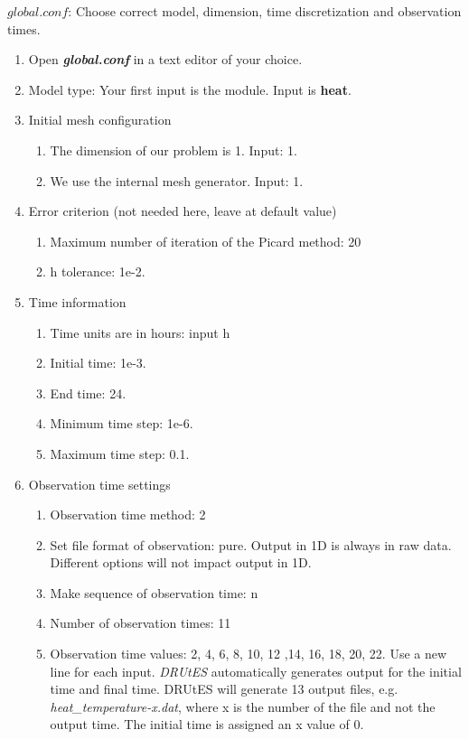 $global.conf$: Choose correct model, dimension, time discretization and observation times.
\begin{enumerate}
\item Open \textbf{\emph{global.conf}} in a text editor of your choice. 
\item Model type: Your first input is the module. Input is \textbf{heat}.
\item Initial mesh configuration \begin{enumerate}
\item The dimension of our problem is 1. Input: 1.
\item We use the internal mesh generator. Input: 1. 
\end{enumerate}
\item Error criterion (not needed here, leave at default value) \begin{enumerate} 
\item Maximum number of iteration of the Picard method: 20 
\item h tolerance: 1e-2.
\end{enumerate}
\item Time information 
\begin{enumerate} 
\item Time units are in hours: input h
\item Initial time: 1e-3.
\item End time: 24.
\item Minimum time step: 1e-6.
\item Maximum time step: 0.1.
\end{enumerate}
\item Observation time settings \begin{enumerate}
\item Observation time method: 2
\item Set file format of observation: pure. Output in 1D is always in raw data. Different options will not impact output in 1D.
\item Make sequence of observation time: n
\item Number of observation times: 11
\item Observation time values: 2, 4, 6, 8, 10, 12 ,14, 16, 18, 20, 22. Use a new line for each input. \textit{DRUtES} automatically generates output for the initial time and final time. DRUtES will generate 13 output files, e.g. \textit{heat\_temperature-x.dat}, where x is the number of the file and not the output time. The initial time is assigned an x value of 0. 

\end{enumerate}
\end{enumerate}
